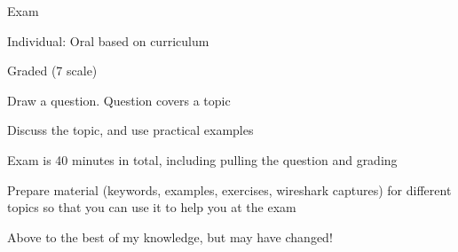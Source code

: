 \documentclass[Screen16to9,17pt]{foils}
\begin{document}
\begin{list2}
\item Exam
\item Individual: Oral based on curriculum
\item Graded (7 scale)
\item Draw a question. Question covers a topic
\item Discuss the topic, and use practical examples
\item Exam is 40 minutes in total, including pulling the question and grading
\item Prepare material (keywords, examples, exercises, wireshark captures) for different topics so that you can use it to help you at the exam

\end{list2}

\centerline{Above to the best of my knowledge, but may have changed!}
\end{document}
